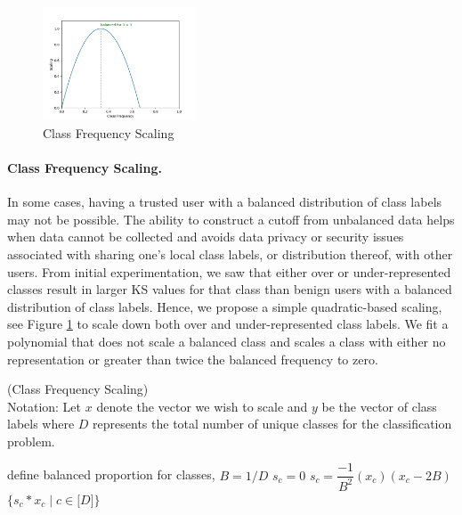 \documentclass{article} %
\begin{document}
\begin{figure}
    \centering
    \includegraphics[width=0.4\textwidth]{make_article/make_visuals/visuals/scaling.png}
    \caption{Class Frequency Scaling}
    \label{fig: scaling}
\end{figure}

\paragraph{Class Frequency Scaling.} In some cases, having a trusted user with a balanced distribution of class labels may not be possible. The ability to construct a cutoff from unbalanced data helps when data cannot be collected and avoids data privacy or security issues associated with sharing one's local class labels, or distribution thereof, with other users. From initial experimentation, we saw that either over or under-represented classes result in larger KS values for that class than benign users with a balanced distribution of class labels. Hence, we propose a simple quadratic-based scaling, see Figure \ref{fig: scaling} to scale down both over and under-represented class labels. We fit a polynomial that does not scale a balanced class and scales a class with either no representation or greater than twice the balanced frequency to zero.

\begin{algorithm}[H]
\caption{ (Class Frequency Scaling) \\ 
Notation: Let $x$ denote the vector we wish to scale and $y$ be the vector of class labels where $D$ represents the total number of unique classes for the classification problem. 
}
\label{alg:scaling}
\begin{algorithmic}[1]
    \State define balanced proportion for classes, $B = 1/D$
                \State $s_c = 0$
            \Else
                \State $s_c = \dfrac{-1}{B^2}(x_c)(x_c - 2B)$
            \EndIf
        \EndFor
    \State \Return $\{s_c * x_c \mid c \in \mathopen[ D \mathclose] \}$
    \EndProcedure
\end{algorithmic}
\end{algorithm}
\end{document}

